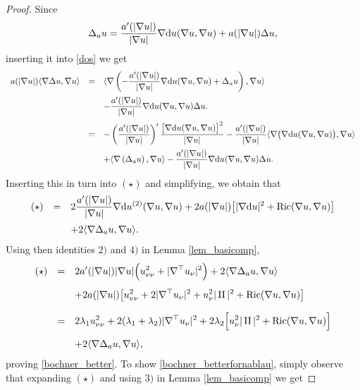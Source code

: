 \documentclass[10 pt,a4paper]{article}
\theoremstyle{definition}
\begin{document}
\begin{proof}
	Since 
	$$
		\Delta_a u = \frac{a'(|\nabla u|)}{|\nabla u|}\nabla \mathrm{d}  u(\nabla u, \nabla u) + a(|\nabla u|) \Delta u,
	$$
	inserting it into \eqref{dos} we get
	\begin{equation}\label{tres}
		\begin{array}{lcl}
			\displaystyle a(|\nabla u|) \langle \nabla \Delta u, \nabla u \rangle & = & \displaystyle \langle \nabla \left(-\frac{a'(|\nabla u|)}{|\nabla u|}\nabla \mathrm{d}  u(\nabla u, \nabla u) + \Delta_a u \right), \nabla u \rangle \\[0.4cm]
			& & \displaystyle - \frac{a'(|\nabla u|)}{|\nabla u|}\nabla \mathrm{d}   u(\nabla u, \nabla u) \Delta u. \\[0.4cm]
			& = & \displaystyle - \left(\frac{a'(|\nabla u|)}{|\nabla u|}\right)' \frac{\big[\nabla \mathrm{d}  u(\nabla u, \nabla u)\big]^2}{|\nabla u|} - \frac{a'(|\nabla u|)}{|\nabla u|} \langle \nabla \big( \nabla \mathrm{d}  u(\nabla u, \nabla u) \big), \nabla u \rangle \\[0.4cm]
			& &  \displaystyle + \langle \nabla \left(\Delta_a u\right), \nabla u \rangle - \frac{a'(|\nabla u|)}{|\nabla u|}\nabla \mathrm{d}  u(\nabla u, \nabla u)\Delta u.
		\end{array}
	\end{equation}
	Inserting this in turn into $(\star)$ and simplifying, we obtain that
	$$
		\begin{array}{lcl}
			(\star) & = & \displaystyle 2\frac{a'(|\nabla u|)}{|\nabla u|} \nabla \mathrm{d} u^{(2)}(\nabla u, \nabla u) + \displaystyle 2a(|\nabla u|) \big[ |\nabla \mathrm{d}  u|^2 + \mathrm{Ric}(\nabla u, \nabla u)\big] \\[0.4cm]
			& & + 2\langle \nabla \Delta_a u, \nabla u \rangle.
		\end{array}
	$$
	Using then identities $2)$ and $4)$ in Lemma \ref{lem_basicomp},
	$$
		\begin{array}{lcl}
			(\star) & = & \displaystyle \displaystyle 2 a'(|\nabla u|)|\nabla u|\Big( u_{\nu\nu}^2 + |\nabla^\top   u_\nu|^2\Big) + 2\langle \nabla \Delta_a u, \nabla u \rangle \\[0.4cm]
			& & + \displaystyle 2a(|\nabla u|) \big[u_{\nu\nu}^2 + 2|\nabla^\top   u_\nu|^2 + u_\nu^2|\operatorname{II}|^2 + \mathrm{Ric}(\nabla u, \nabla u)\big] \\[0.4cm]
			& = & \displaystyle 2 \lambda_1 u_{\nu\nu}^2 + 2(\lambda_1+ \lambda_2) |\nabla^\top   u_\nu|^2 + 2\lambda_2 \Big[u_\nu^2|\operatorname{II}|^2 + \mathrm{Ric}(\nabla u, \nabla u)\Big] \\[0.4cm]
			& & \displaystyle + 2\langle \nabla \Delta_a u, \nabla u \rangle,
		\end{array}
	$$
	proving \eqref{bochner_better}. To show \eqref{bochner_betterfornablau}, simply observe that expanding $(\star)$ and using $3)$ in Lemma \ref{lem_basicomp} we get

\end{proof}
\end{document}
